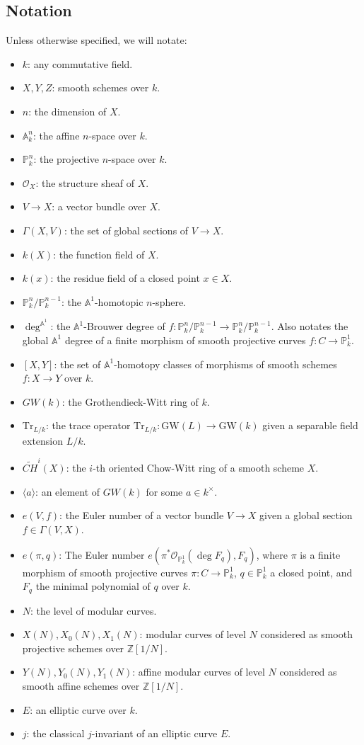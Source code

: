\documentclass[12pt, reqno]{amsart}
\theoremstyle{definition}
\newcommand{\Z}{\mathbb{Z}}
\newcommand{\A}{\mathbb{A}} %
\newcommand{\Proj}{\mathbb{P}} %
\newcommand{\GW}{\mathrm{GW}} %
\newcommand{\Adeg}{\deg^{\mathbb{A}^1}} %
\newcommand{\Oh}{\mathscr{O}} %
\newcommand{\Tr}{\mathrm{Tr}} %
\begin{document}
\subsection{Notation}
Unless otherwise specified, we will notate:
\begin{itemize}
    \item $k$: any commutative field.
    \item $X, Y, Z$: smooth schemes over $k$.
    \item $n$: the dimension of $X$.
    \item $\A^n_k$: the affine $n$-space over $k$.
    \item $\Proj^n_k$: the projective $n$-space over $k$.
    \item $\Oh_X$: the structure sheaf of $X$.
    \item $V \to X$: a vector bundle over $X$.
    \item $\Gamma(X,V)$: the set of global sections of $V \to X$.
    \item $k(X)$: the function field of $X$.
    \item $k(x)$: the residue field of a closed point $x \in X$.
    \item $\Proj^n_k / \Proj^{n-1}_k$: the $\A^1$-homotopic $n$-sphere.
    \item $\Adeg$: the $\A^1$-Brouwer degree of $f: \Proj^n_k / \Proj^{n-1}_k \to \Proj^n_k / \Proj^{n-1}_k$. Also notates the global $\A^1$ degree of a finite morphism of smooth projective curves $f: C \to \Proj^1_k$.
    \item $[X, Y]$: the set of $\A^1$-homotopy classes of morphisms of smooth schemes $f:X \to Y$ over $k$.
    \item $GW(k)$: the Grothendieck-Witt ring of $k$.
    \item $\Tr_{L/k}$: the trace operator $\Tr_{L/k}: \GW(L) \to \GW(k)$ given a separable field extension $L/k$.
    \item $\widetilde{CH}^i(X)$: the $i$-th oriented Chow-Witt ring of a smooth scheme $X$.
    \item $\langle a \rangle$: an element of $GW(k)$ for some $a \in k^\times$.
    \item $e(V,f)$: the Euler number of a vector bundle $V \to X$ given a global section $f \in \Gamma(V,X)$.
    \item $e(\pi, q)$: The Euler number $e(\pi^* \Oh_{\Proj^1_k} (\deg F_q), F_q)$, where $\pi$ is a finite morphism of smooth projective curves $\pi: C \to \Proj^1_k$, $q \in \Proj^1_k$ a closed point, and $F_q$ the minimal polynomial of $q$ over $k$.
    \item $N$: the level of modular curves.
    \item $X(N), X_0(N), X_1(N)$: modular curves of level $N$ considered as smooth projective schemes over $\Z[1/N]$.
    \item $Y(N), Y_0(N), Y_1(N)$: affine modular curves of level $N$ considered as smooth affine schemes over $\Z[1/N]$.
    \item $E$: an elliptic curve over $k$.
    \item $j$: the classical $j$-invariant of an elliptic curve $E$.
\end{itemize}
\end{document}
